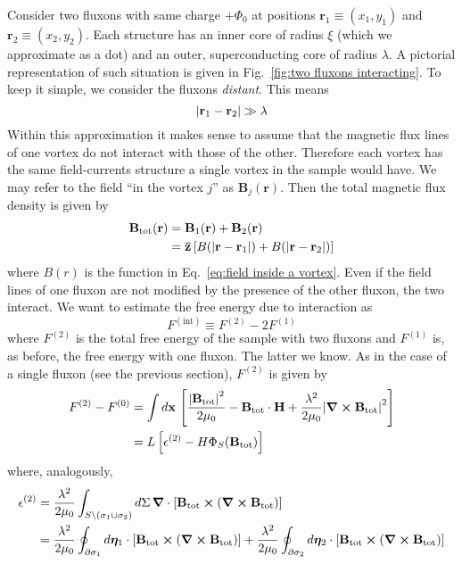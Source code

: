 Consider two fluxons with same charge $+\Phi_0$ at positions $\mathbf{r}_1\equiv(x_1,y_1)$ and $\mathbf{r}_2\equiv(x_2,y_2)$. Each structure has an inner core of radius $\xi$ (which we approximate as a dot) and an outer, superconducting core of radius $\lambda$. A pictorial representation of such situation is given in Fig.~\ref{fig:two fluxons interacting}. To keep it simple, we consider the fluxons \textit{distant}. This means
\[
	\abs{\mathbf{r}_1-\mathbf{r}_2} \gg \lambda
\]
Within this approximation it makes sense to assume that the magnetic flux lines of one vortex do not interact with those of the other. Therefore each vortex has the same field-currents structure a single vortex in the sample would have. We may refer to the field ``in the vortex $j$'' as $\mathbf{B}_j(\mathbf{r})$. Then the total magnetic flux density is given by
\[
\begin{aligned}
	\mathbf{B}_\mathrm{tot}(\mathbf{r}) &= \mathbf{B}_1(\mathbf{r}) + \mathbf{B}_2(\mathbf{r}) \\
	&= \mathbf{\bar{z}} \left[{B(\abs{\mathbf{r}-\mathbf{r}_1})+B(\abs{\mathbf{r}-\mathbf{r}_2})}\right]
\end{aligned}
\]
where $B(r)$ is the function in Eq.~\eqref{eq:field inside a vortex}. Even if the field lines of one fluxon are not modified by the presence of the other fluxon, the two interact. We want to estimate the free energy due to interaction as
\[
	F^{(\mathrm{int})} \equiv F^{(2)} - 2F^{(1)}
\]
where $F^{(2)}$ is the total free energy of the sample with two fluxons and $F^{(1)}$ is, as before, the free energy with one fluxon. The latter we know. As in the case of a single fluxon (see the previous section), $F^{(2)}$ is given by
\begin{align}
	F^{(2)} - F^{(0)} &= \int d\mathbf{x} \, \left[{ \frac{\abs{\mathbf{B}_\mathrm{tot}}^2}{2\mu_0} - \mathbf{B}_\mathrm{tot}\cdot\mathbf{H} + \frac{\lambda^2}{2\mu_0} \abs{\curl\mathbf{B}_\mathrm{tot}}^2}\right] \nonumber \\
	&= L \left[{\epsilon^{(2)}-H\Phi_S(\mathbf{B}_\mathrm{tot})}\right] \label{eq:two fluxons free energy intermediate passage}
\end{align}
where, analogously,
\[
\begin{aligned}
	\epsilon^{(2)} &= \frac{\lambda^2}{2\mu_0} \int_{S\setminus\left({\sigma_1\cup\sigma_2}\right)} d\Sigma \, \grad \cdot \left[{ \mathbf{B}_\mathrm{tot} \bm{\times} \left({\curl\mathbf{B}_\mathrm{tot}}\right) }\right] \\
	&= \frac{\lambda^2}{2\mu_0} \oint_{\partial\sigma_1} d\bm\eta_1 \cdot \left[{ \mathbf{B}_\mathrm{tot} \bm{\times} \left({\curl\mathbf{B}_\mathrm{tot}}\right) }\right] + \frac{\lambda^2}{2\mu_0} \oint_{\partial\sigma_2} d\bm\eta_2 \cdot \left[{ \mathbf{B}_\mathrm{tot} \bm{\times} \left({\curl\mathbf{B}_\mathrm{tot}}\right) }\right]
\end{aligned}
\]
